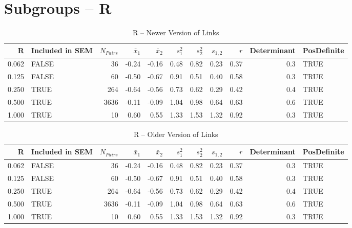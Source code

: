 \documentclass{article}\usepackage[]{graphicx}\usepackage[]{color}
\begin{document}
\section{Subgroups --  R }%
\begin{table}[ht]
\centering
\begin{tabular}{rlrrrrrrrrl}
  \hline
R & Included in SEM & $N_{Pairs}$ & $\bar{x}_1$ & $\bar{x}_2$ & $s_1^2$ & $s_2^2$ & $s_{1,2}$ & $r$ & Determinant & PosDefinite \\ 
  \hline
0.062 & FALSE & 36 & -0.24 & -0.16 & 0.48 & 0.82 & 0.23 & 0.37 & 0.3 & TRUE \\ 
  0.125 & FALSE & 60 & -0.50 & -0.67 & 0.91 & 0.51 & 0.40 & 0.58 & 0.3 & TRUE \\ 
  0.250 & TRUE & 264 & -0.64 & -0.56 & 0.73 & 0.62 & 0.29 & 0.42 & 0.4 & TRUE \\ 
  0.500 & TRUE & 3636 & -0.11 & -0.09 & 1.04 & 0.98 & 0.64 & 0.63 & 0.6 & TRUE \\ 
  1.000 & TRUE & 10 & 0.60 & 0.55 & 1.33 & 1.53 & 1.32 & 0.92 & 0.3 & TRUE \\ 
   \hline
\end{tabular}
\caption{R -- Newer Version of Links} 
\end{table}
\begin{table}[ht]
\centering
\begin{tabular}{rlrrrrrrrrl}
  \hline
R & Included in SEM & $N_{Pairs}$ & $\bar{x}_1$ & $\bar{x}_2$ & $s_1^2$ & $s_2^2$ & $s_{1,2}$ & $r$ & Determinant & PosDefinite \\ 
  \hline
0.062 & FALSE & 36 & -0.24 & -0.16 & 0.48 & 0.82 & 0.23 & 0.37 & 0.3 & TRUE \\ 
  0.125 & FALSE & 60 & -0.50 & -0.67 & 0.91 & 0.51 & 0.40 & 0.58 & 0.3 & TRUE \\ 
  0.250 & TRUE & 264 & -0.64 & -0.56 & 0.73 & 0.62 & 0.29 & 0.42 & 0.4 & TRUE \\ 
  0.500 & TRUE & 3636 & -0.11 & -0.09 & 1.04 & 0.98 & 0.64 & 0.63 & 0.6 & TRUE \\ 
  1.000 & TRUE & 10 & 0.60 & 0.55 & 1.33 & 1.53 & 1.32 & 0.92 & 0.3 & TRUE \\ 
   \hline
\end{tabular}
\caption{R -- Older Version of Links} 
\end{table}
\newpage 
\end{document}
